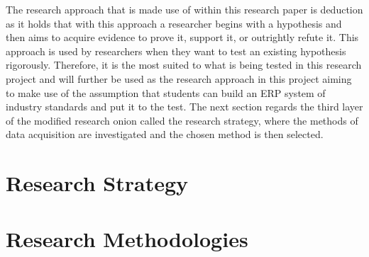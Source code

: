 \par{The research approach that is made use of within this research paper is deduction as it holds that with this approach a researcher begins with a hypothesis and then aims to acquire evidence to prove it, support it, or outrightly refute it. This approach is used by researchers when they want to test an existing hypothesis rigorously. Therefore, it is the most suited to what is being tested in this research project and will further be used as the research approach in this project aiming to make use of the assumption that students can build an ERP system of industry standards and put it to the test. The next section regards the third layer of the modified research onion called the research strategy, where the methods of data acquisition are investigated and the chosen method is then selected.}


\section{Research Strategy}


\section{Research Methodologies}
